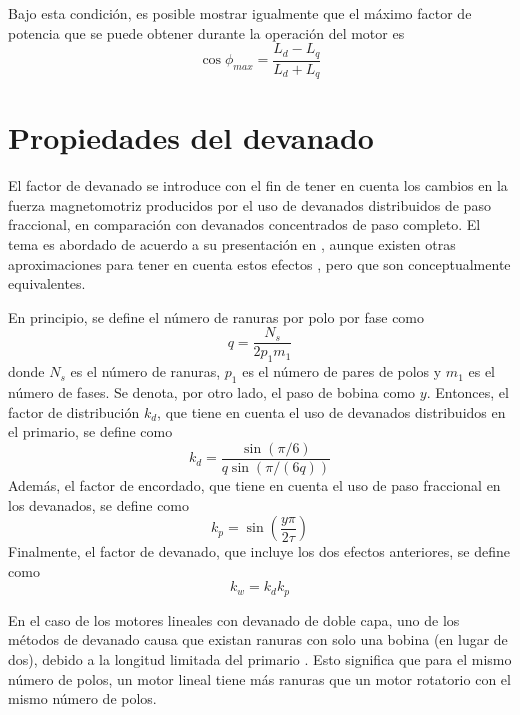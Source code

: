 Bajo esta condición, es posible mostrar igualmente  \cite{boldea2013} que el máximo factor de potencia que se puede obtener durante la operación del motor es
\begin{equation}
\cos\phi_{max} = \frac{L_d-L_q}{L_d+L_q}
\end{equation}

\section{Propiedades del devanado}
El factor de devanado se introduce con el fin de tener en cuenta los cambios en la fuerza magnetomotriz producidos por el uso de devanados distribuidos de paso fraccional, en comparación con devanados concentrados de paso completo. El tema es abordado de acuerdo a su presentación en \cite{boldea2010}, aunque existen otras aproximaciones para tener en cuenta estos efectos \cite{chapman2003}, pero que son conceptualmente equivalentes.

En principio, se define el número de ranuras por polo por fase como
\begin{equation}
q = \frac{N_s}{2p_1 m_1}
\end{equation}
donde $N_s$ es el número de ranuras, $p_1$ es el número de pares de polos y $m_1$ es el número de fases. Se denota, por otro lado, el paso de bobina como $y$. Entonces, el factor de distribución $k_d$, que tiene en cuenta el uso de devanados distribuidos en el primario, se define como
\begin{equation}
k_d = \frac{\sin(\pi/6)}{q\sin(\pi/(6q))}
\end{equation}
Además, el factor de encordado, que tiene en cuenta el uso de paso fraccional en los devanados, se define como
\begin{equation}
k_p = \sin\left( \frac{y\pi}{2\tau} \right)
\end{equation}
Finalmente, el factor de devanado, que incluye los dos efectos anteriores, se define como
\begin{equation}
k_w = k_d k_p
\end{equation}

En el caso de los motores lineales con devanado de doble capa, uno de los métodos de devanado causa que existan ranuras con solo una bobina (en lugar de dos), debido a la longitud limitada del primario \cite{gieras2000}. Esto significa que para el mismo número de polos, un motor lineal tiene más ranuras que un motor rotatorio con el mismo número de polos.

